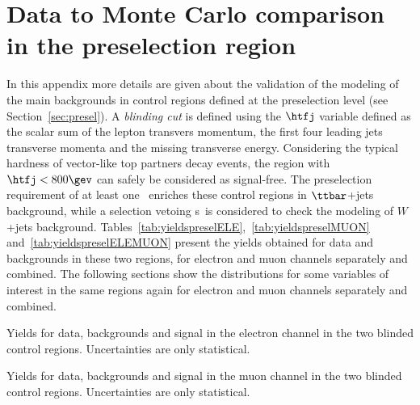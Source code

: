 \clearpage{\pagestyle{empty}\cleardoublepage}

\chapter{Data to Monte Carlo comparison in the preselection region}
\label{app:datamcpresel}

In this appendix more details are given about the 
validation of the modeling of the main backgrounds in
control regions defined at the preselection level 
(see Section~\ref{sec:presel}). A {\it blinding cut}
is defined using the $\htfj$ variable defined as the scalar sum of the
lepton transvers momentum, the first four leading jets transverse momenta
and the missing transverse energy. Considering the typical hardness of
vector-like top partners decay events, the region with $\htfj<800\gev$ can
safely be considered as signal-free. 
The preselection requirement of at least one \bjet\ enriches these control
regions in $\ttbar$+jets background, while  a selection vetoing \bjet s\
is considered to check the modeling of $W$+jets background.
Tables~\ref{tab:yieldspreselELE},~\ref{tab:yieldspreselMUON} and~\ref{tab:yieldspreselELEMUON}
present the yields obtained for data and backgrounds in these two regions,
for electron and muon channels separately and combined.
The following sections show the distributions for some variables of interest
in the same regions again for electron and muon channels separately and combined.

\begin{table}[htb]\centering
        
\caption{Yields for data, backgrounds and signal in the electron channel in the two blinded control
                regions. Uncertainties are only statistical.}\label{tab:yieldspreselELE}
\end{table}

\begin{table}[htb]\centering
        
\caption{Yields for data, backgrounds and signal in the muon  channel in the two blinded control
                regions. Uncertainties are only statistical.}\label{tab:yieldspreselMUON}
\end{table}

